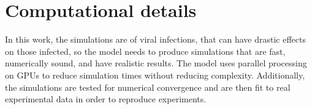 \begin{table}
\caption{Parameter values to simulate an influenza infection with the ABM/PDM model.\label{tab_params}}
\end{table}


\section{Computational details}

In this work, the simulations are of viral infections, that can have drastic effects on those infected, so the model needs to produce simulations that are fast, numerically sound, and have realistic results. The model uses parallel processing on GPUs to reduce simulation times without reducing complexity. Additionally, the simulations are tested for numerical convergence and are then fit to real experimental data in order to reproduce experiments.

